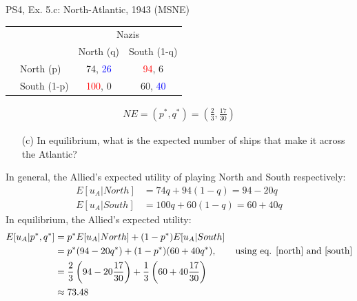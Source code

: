 \begin{frame}{PS4, Ex. 5.c: North-Atlantic, 1943 (MSNE)}
    \begin{table}
      \begin{tabular}{cl|c|c|}
          & \multicolumn{1}{c}{} & \multicolumn{2}{c}{\color{blue}Nazis}\\
          \parbox[t]{1mm}{}
          &  &  &  \\
          & North (p)    & 74, \textcolor{blue}{26} & \textcolor{red}{94}, 6 \\
          & South (1-p)  & \textcolor{red}{100}, 0 & 60, \textcolor{blue}{40} \\
      \end{tabular}
    \end{table}
    \vspace{-8pt}
    \begin{align*}
       NE=(p^{*},q^{*})=\left(\frac{2}{3},\frac{17}{30}\right)
    \end{align*}
    \vspace{-10pt}
    \begin{itemize}
      \item[(c)] In equilibrium, what is the expected number of ships that make it across the Atlantic?
    \end{itemize}
    In general, the Allied's expected utility of playing North and South respectively:
    \begin{align}
      E[u_A|North]&=74q + 94(1-q)=94-20q\label{north}\\
      E[u_A|South]&=100q + 60(1-q)=60+40q\label{south}
    \end{align}
    In equilibrium, the Allied's expected utility:
    \begin{align*}
      E[u_A|p^{*},q^{*}] &= p^{*}E[u_A|North]+(1-p^{*})E[u_A|South]\\
        &= p^{*}(94-20q^{*})+(1-p^{*})(60+40q^{*}),\quad\quad\text{using eq. \eqref{north} and \eqref{south}}\\
        &= \frac{2}{3}\left(94-20\frac{17}{30}\right)+\frac{1}{3}\left(60+40\frac{17}{30}\right)\\
        &\approx 73.48 %
    \end{align*}
  \vfill\null
\end{frame}


